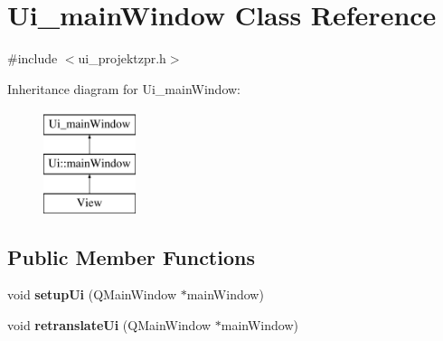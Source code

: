 \section{Ui\-\_\-main\-Window Class Reference}
\label{class_ui__main_window}


{\ttfamily \#include $<$ui\-\_\-projektzpr.\-h$>$}

Inheritance diagram for Ui\-\_\-main\-Window\-:\begin{figure}[H]
\begin{center}
\leavevmode
\includegraphics[height=3.000000cm]{class_ui__main_window}
\end{center}
\end{figure}
\subsection*{Public Member Functions}
\begin{DoxyCompactItemize}
\item 
void {\bf setup\-Ui} (Q\-Main\-Window $\ast$main\-Window)
\item 
void {\bf retranslate\-Ui} (Q\-Main\-Window $\ast$main\-Window)
\end{DoxyCompactItemize}
